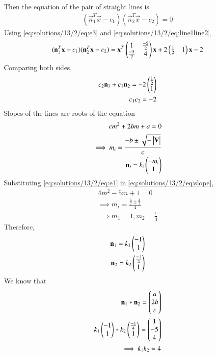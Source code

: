 Then the equation of the pair of straight lines is
\begin{align}\label{eq:solutions/13/2/eq:line1line2}
    (\vec{n}_1^T\vec{x}-c_1)(\vec{n}_2^T\vec{x}-c_2) = 0
\end{align}
Using \eqref{eq:solutions/13/2/eq:e3} and \eqref{eq:solutions/13/2/eq:line1line2},
\begin{align}
    (\mathbf{n}_1^T\mathbf{x}-c_1)(\mathbf{n}_2^T\mathbf{x}-c_2) = \mathbf{x}^T\begin{pmatrix}1 & \frac{-5}{2} \\ \frac{-5}{2} & 4\end{pmatrix}\mathbf{x} + 2\begin{pmatrix}\frac{1}{2} & 1\end{pmatrix}\mathbf{x} -2
\end{align}
Comparing both sides,
\begin{align}
    c_2\mathbf{n}_1+c_1\mathbf{n}_2 = -2\begin{pmatrix}\frac{1}{2} \\ 1\end{pmatrix}\label{eq:solutions/13/2/eq:c1c2}\\
    c_1c_2 = -2
\end{align}
Slopes of the lines are roots of the equation
\begin{align}
    cm^2+2bm+a=0 \label{eq:solutions/13/2/eq:slope}\\
    \implies m_i = \frac{-b\pm \sqrt{-\begin{vmatrix}\mathbf{V}\end{vmatrix}}}{c}\\
    \mathbf{n}_i = k_i\begin{pmatrix}-m_i \\ 1\end{pmatrix}
\end{align}
Substituting \eqref{eq:solutions/13/2/eq:e1} in \eqref{eq:solutions/13/2/eq:slope},
\begin{align}
    4m^2-5m+1=0\\
    \implies m_i = \frac{\frac{5}{2}\pm \frac{3}{2}}{4} \\
    \implies m_1 = 1, m_2 = \frac{1}{4}
\end{align}
Therefore,
\begin{align}
    \mathbf{n}_1=k_1\begin{pmatrix}-1 \\ 1\end{pmatrix}\\
    \mathbf{n}_2=k_2\begin{pmatrix}\frac{-1}{4} \\ 1\end{pmatrix}
\end{align}
We know that
\begin{align}
	\label{eq:solutions/13/2/n1n2}\mathbf{n}_1*\mathbf{n}_2 = \begin{pmatrix}a\\2b\\c\end{pmatrix}\\
	k_1\begin{pmatrix}-1 \\ 1\end{pmatrix}*k_2\begin{pmatrix}\frac{-1}{4} \\ 1\end{pmatrix} = \begin{pmatrix}1 \\ -5 \\ 4\end{pmatrix}\\
	\implies k_1k_2 = 4
\end{align}

